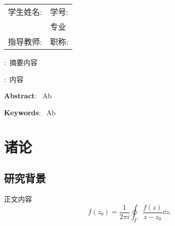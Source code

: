 \documentclass[UTF8,heading=true,12pt,AutoFakeBold={2.0}]{article}
\author{NAME} %
\begin{document}
	\maketitle%
	\newpage
	\tableofcontents%
	\setcounter{page}{0}%
	\thispagestyle{empty}%
	\newpage
	\begin{center}
		\bfseries{\the\zhtitle}%
	\end{center}
	
	\begin{table}[H]
		\vspace{-1.5em}
		\centering
		\begin{spacing}{1.5}
			\begin{tabular}{rl} %
				学生姓名: {\the\author} & 学号: {\the\serialnumber}\\ 
				{\the\college} & {\the\major}专业\\
				指导教师: {\the\advisor} & 职称: {\the\advisors}\\	
			\end{tabular}
		\end{spacing}
		\vspace{-1.5em}
	\end{table}
	
	{\heiti {}}:{\kaishu{}\ 摘要内容} %
	
	
	{\heiti {}}:{\kaishu{}\ 内容}%
	
	\begin{center}
	\end{center}
	
	{\bfseries{Abstract}}:\  Ab
	
	{\bfseries{Keywords}}:\  Ab
	
	\section{诸论}
	\subsection{研究背景}
	正文内容
	$$
	f(z_0)=\frac{1}{2\pi i}\oint_{\Gamma}\frac{f(z)}{z-z_0}\dd z.
	$$
	
\end{document}

